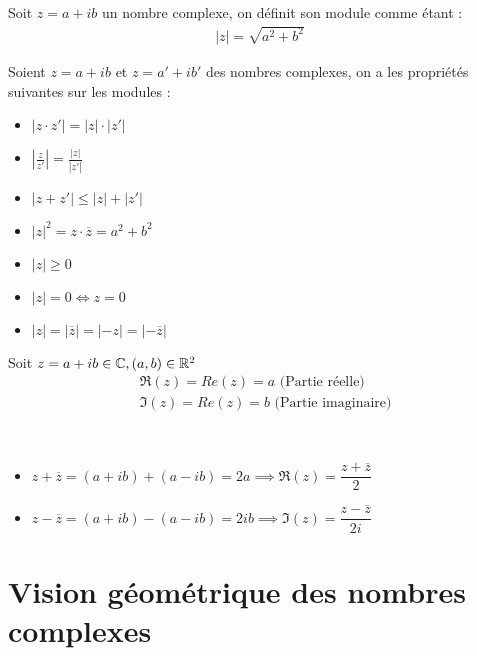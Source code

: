 \begin{definition}
    Soit $z = a + ib$ un nombre complexe, on définit son module comme étant :
    \begin{align*}
        |z| = \sqrt{a^2 + b^2}
    \end{align*}
\end{definition}

\begin{proposition}
    Soient $z = a + ib$ et $z = a' + ib'$ des nombres complexes, on a les propriétés suivantes sur les modules :
    \begin{itemize}
        \item $|z \cdot z'| = |z| \cdot |z'|$
        \item $\left| \frac{z}{z'} \right| = \frac{|z|}{|z'|}$
        \item $|z + z'| \leq |z| + |z'|$
        \item $|z|^2 = z \cdot \overline{z} = a^2 + b^2$
        \item $|z| \geq 0$
        \item $|z| = 0 \iff z = 0$
        \item $|z| = |\overline{z}| = |-z| = |-\overline{z}|$
    \end{itemize}
\end{proposition}

\begin{definition}
    Soit $z = a + ib \in \mathbb{C}, (a, b) \in \mathbb{R}^2$
    \begin{align*}
        &\Re(z) = Re(z) = a \text{ (Partie réelle)} \\
        &\Im(z) = Re(z) = b \text{ (Partie imaginaire)}
    \end{align*}
\end{definition}

\begin{proposition}[Propriétés]~
    \begin{itemize}
        \item $z + \overline{z} = (a + ib) + (a - ib) = 2a \implies \Re(z) = \dfrac{z + \overline{z}}{2}$
        \item $z - \overline{z} = (a + ib) - (a - ib) = 2ib \implies \Im(z) = \dfrac{z - \overline{z}}{2i}$
    \end{itemize}
\end{proposition}

\section{Vision géométrique des nombres complexes}

